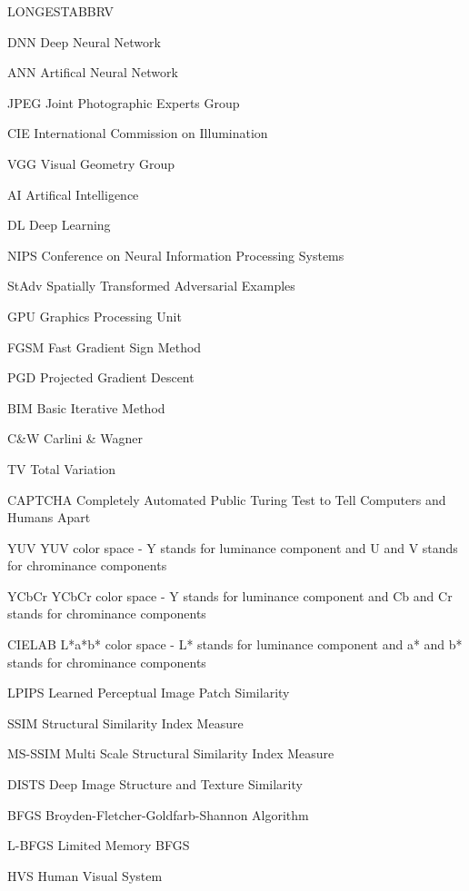 \begin{theglossary}{LONGESTABBRV}

    \item[DNN] Deep Neural Network
    \item[ANN] Artifical Neural Network
    \item[JPEG] Joint Photographic Experts Group
    \item[CIE] International Commission on Illumination
    \item[VGG] Visual Geometry Group
    \item[AI] Artifical Intelligence
    \item[DL] Deep Learning
    \item[NIPS] Conference on Neural Information Processing Systems
    \item[StAdv] Spatially Transformed Adversarial Examples
    \item[GPU] Graphics Processing Unit
    \item[FGSM] Fast Gradient Sign Method
    \item[PGD] Projected Gradient Descent
    \item[BIM] Basic Iterative Method
    \item[C\&W] Carlini \& Wagner
    \item[TV] Total Variation
    \item[CAPTCHA] Completely Automated Public Turing Test to Tell Computers and Humans Apart
    \item[YUV] YUV color space - Y stands for luminance component and U and V stands for chrominance components
    \item[YCbCr] YCbCr color space - Y stands for luminance component and Cb and Cr stands for chrominance components
    \item[CIELAB] L*a*b* color space - L* stands for luminance component and a* and b* stands for chrominance components
    \item[LPIPS] Learned Perceptual Image Patch Similarity
    \item[SSIM] Structural Similarity Index Measure
    \item[MS-SSIM] Multi Scale Structural Similarity Index Measure
    \item[DISTS] Deep Image Structure and Texture Similarity
    \item[BFGS] Broyden-Fletcher-Goldfarb-Shannon Algorithm
    \item[L-BFGS] Limited Memory BFGS
    \item[HVS] Human Visual System



\end{theglossary}
